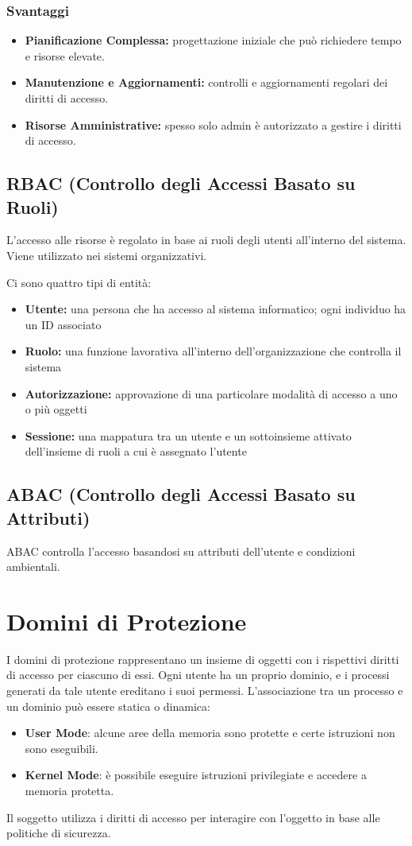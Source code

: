 \subsubsection{Svantaggi}
\begin{itemize}
    \item \textbf{Pianificazione Complessa:} progettazione iniziale che può richiedere tempo e risorse elevate.
    \item \textbf{Manutenzione e Aggiornamenti:} controlli e aggiornamenti regolari dei diritti di accesso.
    \item \textbf{Risorse Amministrative:} spesso solo admin è autorizzato a gestire i diritti di accesso.
\end{itemize}

\subsection{RBAC (Controllo degli Accessi Basato su Ruoli)}
L'accesso alle risorse è regolato in base ai ruoli degli utenti all'interno del sistema. 
Viene utilizzato nei sistemi organizzativi. 

Ci sono quattro tipi di entità:
\begin{itemize}
    \item \textbf{Utente:} una persona che ha accesso al sistema informatico; ogni individuo ha un ID associato
    \item \textbf{Ruolo:} una funzione lavorativa all'interno dell'organizzazione che controlla il sistema
    \item \textbf{Autorizzazione:} approvazione di una particolare modalità di accesso a uno o
    più oggetti
    \item \textbf{Sessione:} una mappatura tra un utente e un sottoinsieme attivato
    dell'insieme di ruoli a cui è assegnato l'utente
\end{itemize}

\subsection{ABAC (Controllo degli Accessi Basato su Attributi)}
ABAC controlla l'accesso basandosi su attributi dell'utente e condizioni ambientali.

\section{Domini di Protezione}
I domini di protezione rappresentano un insieme di oggetti con i rispettivi diritti di accesso per ciascuno di essi. Ogni utente ha un proprio dominio, e i processi generati da tale utente ereditano i suoi permessi. L'associazione tra un processo e un dominio può essere statica o dinamica:
\begin{itemize}
    \item \textbf{User Mode}: alcune aree della memoria sono protette e certe istruzioni non sono eseguibili.
    \item \textbf{Kernel Mode}: è possibile eseguire istruzioni privilegiate e accedere a memoria protetta.
\end{itemize}
Il soggetto utilizza i diritti di accesso per interagire con l'oggetto in base alle politiche di sicurezza.

